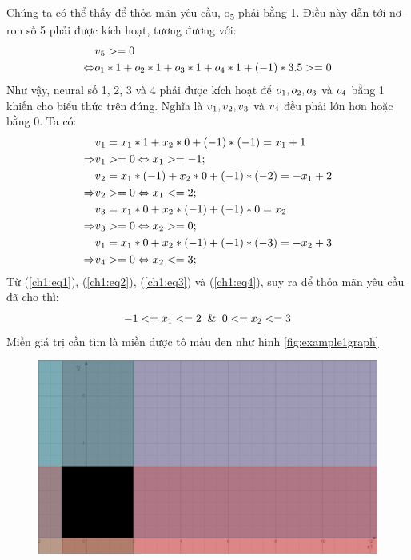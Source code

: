 \begin{answ}
Chúng ta có thể thấy để thỏa mãn yêu cầu, o\textsubscript{5} phải bằng 1. Điều này dẫn tới nơ-ron số 5 phải được kích hoạt, tương đương với:
\begin{align*} 
&v\textsubscript{5} >= 0 \\ 
\Leftrightarrow &o\textsubscript{1} * 1 + o\textsubscript{2} * 1 + o\textsubscript{3} * 1 + o\textsubscript{4} * 1 + (-1) * 3.5 >= 0
\end{align*}
Như vậy, neural số 1, 2, 3 và 4 phải được kích hoạt để $o\textsubscript{1}, o\textsubscript{2}, o\textsubscript{3}$ và $o\textsubscript{4}$ bằng 1 khiến cho biểu thức trên đúng. Nghĩa là $v\textsubscript{1}, v\textsubscript{2}, v\textsubscript{3}$ và $v\textsubscript{4}$ đều phải lớn hơn hoặc bằng 0. Ta có:
\begin{align}
  &v\textsubscript{1} = x\textsubscript{1} * 1 + x\textsubscript{2} * 0 + (-1) * (-1) = x\textsubscript{1} + 1 \nonumber \\
  \Rightarrow &v\textsubscript{1} >= 0 \Leftrightarrow  x\textsubscript{1} >= -1;  \label{ch1:eq1} \\
  &v\textsubscript{2} = x\textsubscript{1} * (-1) + x\textsubscript{2} * 0 + (-1) * (-2) = -x\textsubscript{1} + 2 \nonumber \\
    \Rightarrow &v\textsubscript{2} >= 0 \Leftrightarrow  x\textsubscript{1} <= 2;  \label{ch1:eq2} \\
  &v\textsubscript{3} = x\textsubscript{1} * 0 + x\textsubscript{2} * (-1) + (-1) * 0 = x\textsubscript{2} \nonumber \\
    \Rightarrow &v\textsubscript{3} >= 0 \Leftrightarrow  x\textsubscript{2} >= 0;  \label{ch1:eq3} \\
  &v\textsubscript{1} = x\textsubscript{1} * 0 + x\textsubscript{2} * (-1) + (-1) * (-3) = -x\textsubscript{2} + 3 \nonumber \\
    \Rightarrow &v\textsubscript{4} >= 0 \Leftrightarrow  x\textsubscript{2} <= 3;  \label{ch1:eq4}
\end{align}
\noindent Từ (\ref{ch1:eq1}), (\ref{ch1:eq2}), (\ref{ch1:eq3}) và (\ref{ch1:eq4}), suy ra để thỏa mãn yêu cầu đã cho thì:
\begin{align*}
-1 <= x\textsubscript{1} <= 2 \And 0 <= x\textsubscript{2} <= 3
\end{align*}
Miền giá trị cần tìm là miền được tô màu đen như hình \ref{fig:example1graph}
\begin{figure}[h]
	\centering
		\includegraphics[width=1\columnwidth]{chapter01/figure/example 1_graph.png}

\end{figure}
\end{answ}
